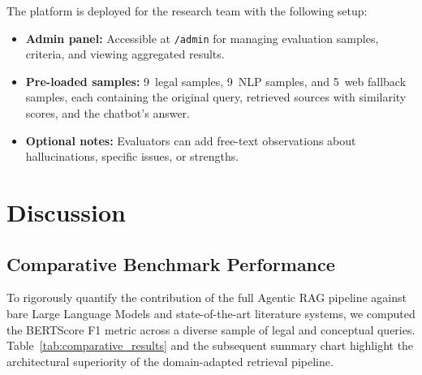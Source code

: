 \documentclass[12pt, a4paper]{article}
\begin{document}
The platform is deployed for the research team with the following setup:
\begin{itemize}[leftmargin=2em]
  \item \textbf{Admin panel:} Accessible at \texttt{/admin} for managing
        evaluation samples, criteria, and viewing aggregated results.
  \item \textbf{Pre-loaded samples:} 9~legal samples, 9~NLP samples, and
        5~web fallback samples, each containing the original query,
        retrieved sources with similarity scores, and the chatbot's answer.
  \item \textbf{Optional notes:} Evaluators can add free-text observations
        about hallucinations, specific issues, or strengths.
\end{itemize}


\section{Discussion}

\subsection{Comparative Benchmark Performance}

To rigorously quantify the contribution of the full Agentic RAG pipeline against bare Large Language Models and state-of-the-art literature systems, we computed the BERTScore F1 metric across a diverse sample of legal and conceptual queries. Table~\ref{tab:comparative_results} and the subsequent summary chart highlight the architectural superiority of the domain-adapted retrieval pipeline.
\end{document}
